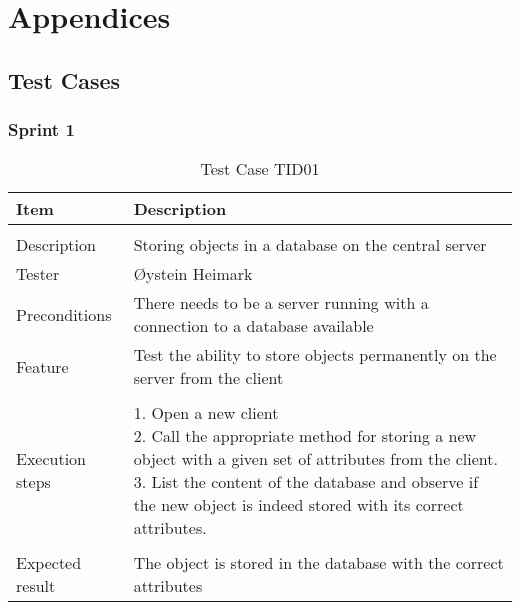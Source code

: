 \chapter{Appendices}
\section{Test Cases}
\subsection{Sprint 1}

\begin{table}
\caption{Test Case TID01}
\centering
\begin{tabular}{ l p{13cm} }
\hline 
 Item            & Description                                                              \\ 
\hline \\ [-2.0ex]
 Description     & Storing objects in a database on the central server                        \\ 
 Tester          & Øystein Heimark                  \\ 
 Preconditions   & There needs to be a server running with a connection to a database available \\ 
 Feature         & Test the ability to store objects permanently on the server from the client  \vspace{3pt}                     \\ 
\hline \\ [-1.5ex]
 Execution steps & \pbox{13cm}{1. Open a new client \\ 2. Call the appropriate method for storing a new object with a given set of attributes from the client. \\ 3. List the content of the database and observe if the new object is indeed stored with its correct attributes. } \vspace{3pt} \\
\hline \\ [-1.5ex]
 Expected result & The object is stored in the database with the correct attributes                                          \\
\hline 
\end{tabular}
\label{table:testcasetid01}
\end{table}


